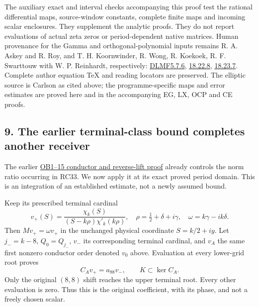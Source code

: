 \documentclass[10pt]{article}
\begin{document}
The auxiliary exact and interval checks accompanying this proof test the rational differential maps, source-window constants, complete finite maps and incoming scalar enclosures. They supplement the analytic proofs. They do not report evaluations of actual zeta zeros or period-dependent native matrices. Human provenance for the Gamma and orthogonal-polynomial inputs remains R. A. Askey and R. Roy, and T. H. Koornwinder, R. Wong, R. Koekoek, R. F. Swarttouw with W. P. Reinhardt, respectively: \href{https://dlmf.nist.gov/5.7.E6}{DLMF5.7.6}, \href{https://dlmf.nist.gov/18.22.E8}{18.22.8}, \href{https://dlmf.nist.gov/18.23.E7}{18.23.7}. Complete author equation TeX and reading locators are preserved. The elliptic source is Carlson as cited above; the programme-specific maps and error estimates are proved here and in the accompanying EG, LX, OCP and CE proofs.

\subsection{9. The earlier terminal-class bound completes another receiver}\label{the-earlier-terminal-class-bound-completes-another-receiver}

The earlier \href{https://github.com/KokunoYumeto/zeta-function-research-reader/blob/6cf5b3aa8ff395eba6b5512b28d117334da5767b/workbenches/splitzero-tandem/continuations/20260922-cutoff-profile/RETAINED_COMPLETE_PROOF_SOURCES.tex\#L127618}{OB1--15 conductor and reverse-lift proof} already controls the norm ratio occurring in RC33. We now apply it at its exact proved period domain. This is an integration of an established estimate, not a newly assumed bound.

Keep its prescribed terminal cardinal \[
v_+(S)=\frac{\chi_k(S)}{(S-k\rho)\chi'_k(k\rho)},
\quad \rho=\tfrac12+\delta+i\gamma,
\quad \omega=k\gamma-ik\delta.
\tag{RC35}
\] Then \(Mv_+=\omega v_+\) in the unchanged physical coordinate \(S=k/2+iy\). Let \(j_-=k-8\), \(Q_0=Q_{j_-}\), \(v_-\) its corresponding terminal cardinal, and \(v_A\) the same first nonzero conductor order denoted \(v_0\) above. Evaluation at every lower-grid root proves \[
C_Av_+=a_{88}v_-,\qquad K\subset\ker C_A.
\tag{RC36}
\] Only the original \((8,8)\) shift reaches the upper terminal root. Every other evaluation is zero. Thus this is the original coefficient, with its phase, and not a freely chosen scalar.
\end{document}
